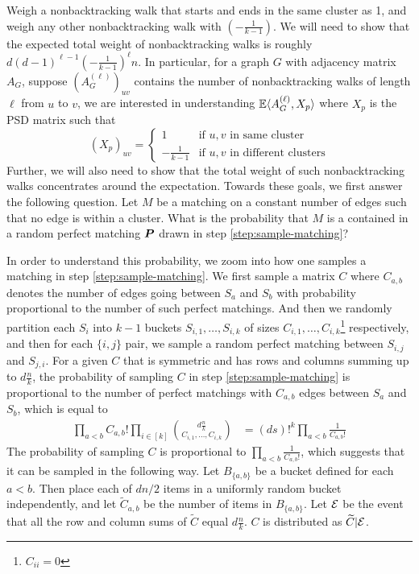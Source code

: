 Weigh a nonbacktracking walk that starts and ends in the same cluster as 1, and weigh any other nonbacktracking walk with $\left(-\frac{1}{k-1}\right)$.  We will need to show that the expected total weight of nonbacktracking walks is roughly $d(d-1)^{\ell-1}\left(-\frac{1}{k-1}\right)^{\ell}n$.  In particular, for a graph $G$ with adjacency matrix $A_G$, suppose $\left(A_G^{(\ell)}\right)_{uv}$ contains the number of nonbacktracking walks of length $\ell$ from $u$ to $v$, we are interested in understanding $\operatorname*{\mathbb{E}}\langle A_G^{(\ell)}, X_p\rangle$ where $X_p$ is the PSD matrix such that
\[
	(X_p)_{uv} =
	\begin{cases}
		1 &\text{if $u,v$ in same cluster}\\
		-\frac{1}{k-1}&\text{if $u,v$ in different clusters}
	\end{cases}
\]
Further, we will also need to show that the total weight of such nonbacktracking walks concentrates around the expectation.  Towards these goals, we first answer the following question.  Let $M$ be a matching on a constant number of edges such that no edge is within a cluster.  What is the probability that $M$ is a contained in a random perfect matching $\boldsymbol{P}$ drawn in step \ref{step:sample-matching}?

In order to understand this probability, we zoom into how one samples a matching in step \ref{step:sample-matching}.  We first sample a matrix $C$ where $C_{a,b}$ denotes the number of edges going between $S_a$ and $S_b$ with probability proportional to the number of such perfect matchings.  And then we randomly partition each $S_i$ into $k-1$ buckets $S_{i,1},\dots,S_{i,k}$ of sizes $C_{i,1},\dots,C_{i,k}$\footnote{$C_{ii} = 0$} respectively, and then for each $\{i,j\}$ pair, we sample a random perfect matching between $S_{i,j}$ and $S_{j,i}$.  For a given $C$ that is symmetric and has rows and columns summing up to $d\frac{n}{k}$, the probability of sampling $C$ in step \ref{step:sample-matching} is proportional to the number of perfect matchings with $C_{a,b}$ edges between $S_a$ and $S_b$, which is equal to
\begin{align*}
	\prod_{a < b} C_{a,b}! \prod_{i\in[k]}\binom{d\frac{n}{k}}{C_{i,1},\dots, C_{i,k}} &= (ds)!^{k} \prod_{a < b} \frac{1}{C_{a,b}!}
\end{align*}
The probability of sampling $C$ is proportional to $\prod_{a<b}\frac{1}{C_{a,b}!}$, which suggests that it can be sampled in the following way.  Let $B_{\{a,b\}}$ be a bucket defined for each $a < b$.  Then place each of $dn/2$ items in a uniformly random bucket independently, and let $\widetilde{C}_{a,b}$ be the number of items in $B_{\{a,b\}}$.  Let $\mathcal{E}$ be the event that all the row and column sums of $\widetilde{C}$ equal $d\frac{n}{k}$.  $C$ is distributed as $\widetilde{C}|\mathcal{E}$.

